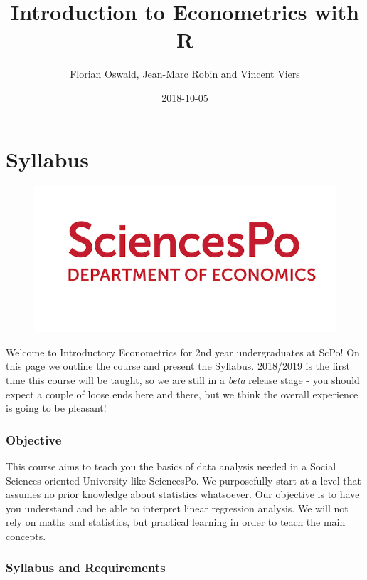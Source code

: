\documentclass[]{book}
\title{Introduction to Econometrics with R}
\author{Florian Oswald, Jean-Marc Robin and Vincent Viers}
\date{2018-10-05}
\theoremstyle{definition}
\theoremstyle{definition}
\theoremstyle{definition}
\theoremstyle{remark}
\begin{document}
\maketitle

{
\setcounter{tocdepth}{1}
\tableofcontents
}
\chapter*{Syllabus}\label{syllabus}

\begin{figure}
\centering
\includegraphics{ScPo.jpg}
\caption{}
\end{figure}

Welcome to Introductory Econometrics for 2nd year undergraduates at
ScPo! On this page we outline the course and present the Syllabus.
2018/2019 is the first time this course will be taught, so we are still
in a \emph{beta} release stage - you should expect a couple of loose
ends here and there, but we think the overall experience is going to be
pleasant!

\subsection*{Objective}\label{objective}

This course aims to teach you the basics of data analysis needed in a
Social Sciences oriented University like SciencesPo. We purposefully
start at a level that assumes no prior knowledge about statistics
whatsoever. Our objective is to have you understand and be able to
interpret linear regression analysis. We will not rely on maths and
statistics, but practical learning in order to teach the main concepts.

\subsection*{Syllabus and Requirements}\label{syllabus-and-requirements}
\end{document}
